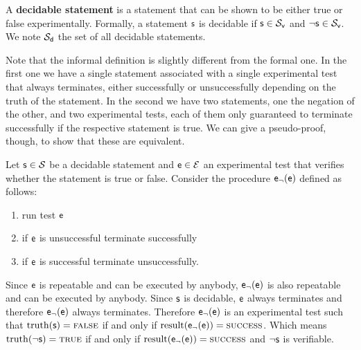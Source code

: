 \documentclass[11pt,letterpaper,fleqn]{memoir} %
\begin{document}
\begin{mathSection}
	\begin{defn}
		A \textbf{decidable statement} is a statement that can be shown to be either true or false experimentally. Formally, a statement $\mathsf{s}$ is decidable if $\mathsf{s} \in \mathcal{S}_\textsf{v}$ and $\neg\mathsf{s} \in \mathcal{S}_\textsf{v}$. We note $\mathcal{S}_\textsf{d}$ the set of all decidable statements.
	\end{defn}
	\begin{justification}
		Note that the informal definition is slightly different from the formal one. In the first one we have a single statement associated with a single experimental test that always terminates, either successfully or unsuccessfully depending on the truth of the statement. In the second we have two statements, one the negation of the other, and two experimental tests, each of them only guaranteed to terminate successfully if the respective statement is true. We can give a pseudo-proof, though, to show that these are equivalent.

		Let $\mathsf{s} \in \mathcal{S}$ be a decidable statement and $\mathsf{e} \in \mathcal{E}$ an experimental test that verifies whether the statement is true or false. Consider the procedure $\mathsf{e}_\neg(\mathsf{e})$ defined as follows:
		\begin{enumerate}
			\item run test $\mathsf{e}$
			\item if $\mathsf{e}$ is unsuccessful terminate successfully
			\item if $\mathsf{e}$ is successful terminate unsuccessfully.
		\end{enumerate}
		Since $\mathsf{e}$ is repeatable and can be executed by anybody, $\mathsf{e}_\neg(\mathsf{e})$ is also repeatable and can be executed by anybody. Since $\mathsf{s}$ is decidable, $\mathsf{e}$ always terminates and therefore $\mathsf{e}_\neg(\mathsf{e})$ always terminates.  Therefore $\mathsf{e}_\neg(\mathsf{e})$ is an experimental test such that $\operatorname{truth}(\mathsf{s})=\textsc{false}$ if and only if $\operatorname{result}(\mathsf{e}_\neg(\mathsf{e}))=\textsc{success}$. Which means $\operatorname{truth}(\neg\mathsf{s})=\textsc{true}$ if and only if $\operatorname{result}(\mathsf{e}_\neg(\mathsf{e}))=\textsc{success}$ and $\neg\mathsf{s}$ is verifiable.
		

\end{justification}
\end{mathSection}
\end{document}
